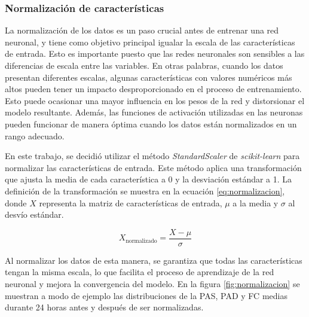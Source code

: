 \subsubsection{Normalización de características}
La normalización de los datos es un paso crucial antes de entrenar una red neuronal, y tiene como 
objetivo principal igualar la escala de las características de entrada. Esto es importante puesto 
que las redes neuronales son sensibles a las diferencias de escala entre las variables. En otras 
palabras, cuando los datos presentan diferentes escalas, algunas características con valores numéricos 
más altos pueden tener un impacto desproporcionado en el proceso de entrenamiento. Esto puede ocasionar 
una mayor influencia en los pesos de la red y distorsionar el modelo resultante. 
Además, las funciones de activación utilizadas en las neuronas pueden funcionar de manera óptima 
cuando los datos están normalizados en un rango adecuado.

En este trabajo, se decidió utilizar el método \emph{StandardScaler} de \emph{scikit-learn} \citep{CITE:50} para 
normalizar las características de entrada. Este método aplica una transformación que ajusta la 
media de cada característica a 0 y la desviación estándar a 1. La definición de la transformación 
se muestra en la ecuación \ref{eq:normalizacion}, donde $X$ representa la matriz de características de 
entrada, $\mu$ a la media y $\sigma$ al desvío estándar. 

\begin{equation}
	\label{eq:normalizacion}
	X_{\text{normalizado}} = \frac{X - \mu}{\sigma}
\end{equation}

Al normalizar los datos de esta manera, se garantiza que todas las características tengan la 
misma escala, lo que facilita el proceso de aprendizaje de la red neuronal y mejora la convergencia 
del modelo. En la figura \ref{fig:normalizacion} se muestran a modo de ejemplo las distribuciones de 
la PAS, PAD y FC medias durante 24 horas antes y después de ser normalizadas. 

